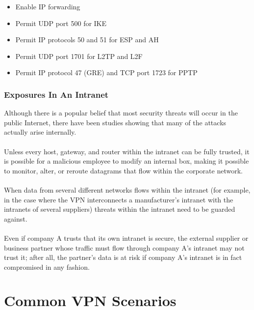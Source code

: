 \documentclass[10pt,a4paper]{article}
\begin{document}
\begin{itemize}
\item Enable IP forwarding
\item Permit UDP port 500 for IKE
\item Permit IP protocols 50 and 51 for ESP and AH
\item Permit UDP port 1701 for L2TP and L2F
\item Permit IP protocol 47 (GRE) and TCP port 1723 for PPTP
\end{itemize}

\section{Exposures In An Intranet}
Although there is a popular belief that most security threats will occur in the public
Internet, there have been studies showing that many of the attacks actually arise
internally. 
\\
\\
Unless every host, gateway, and router within the intranet
can be fully trusted, it is possible for a malicious employee to modify an internal
box, making it possible to monitor, alter, or reroute datagrams that flow within the
corporate network. 
\\
\\
When data from several different networks flows within the
intranet (for example, in the case where the VPN interconnects a manufacturer's
intranet with the intranets of several suppliers) threats within the intranet need to
be guarded against. 
\\
\\
Even if company A trusts that its own intranet is secure, the
external supplier or business partner whose traffic must flow through company
A's intranet may not trust it; after all, the partner's data is at risk if company A's
intranet is in fact compromised in any fashion.
\newpage
\part{Common VPN Scenarios}
\end{document}

